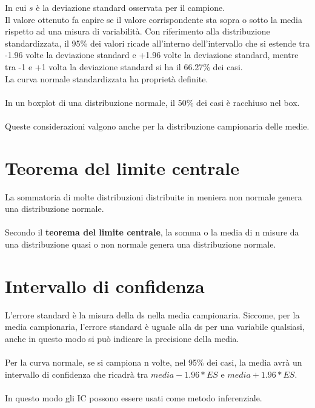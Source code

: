\documentclass[drafts, 10pt]{book}
\begin{document}
In cui $s$ è la deviazione standard osservata per il campione.
\\
Il valore ottenuto fa capire se il valore corrispondente sta sopra o sotto la media rispetto ad una misura di variabilità.
Con riferimento alla distribuzione standardizzata, il 95\% dei valori ricade all’interno dell’intervallo che si estende tra -1.96 volte la deviazione standard e +1.96 volte la deviazione standard, mentre tra -1 e +1 volta la deviazione standard si ha il 66.27\% dei casi.
\\
La curva normale standardizzata ha proprietà definite.
\\
\\
In un boxplot di una distribuzione normale, il 50\% dei casi è racchiuso nel box.
\\
\\
Queste considerazioni valgono anche per la distribuzione campionaria delle medie.

\section{Teorema del limite centrale}
La sommatoria di molte distribuzioni distribuite in meniera non normale genera una distribuzione normale.
\\
\\
Secondo il \textbf{teorema del limite centrale}, la somma o la media di n misure da una distribuzione quasi o non normale genera una distribuzione normale.

\section{Intervallo di confidenza}
L’errore standard è la misura della ds nella media campionaria. Siccome, per la media campionaria, l’errore standard è uguale alla ds per una variabile qualsiasi, anche in questo modo si può indicare la precisione della media.
\\
\\
Per la curva normale, se si campiona n volte, nel 95\% dei casi, la media avrà un intervallo di confidenza che ricadrà tra $media-1.96*ES$ e $media+1.96*ES$.
\\
\\
In questo modo gli IC possono essere usati come metodo inferenziale.
\end{document}
